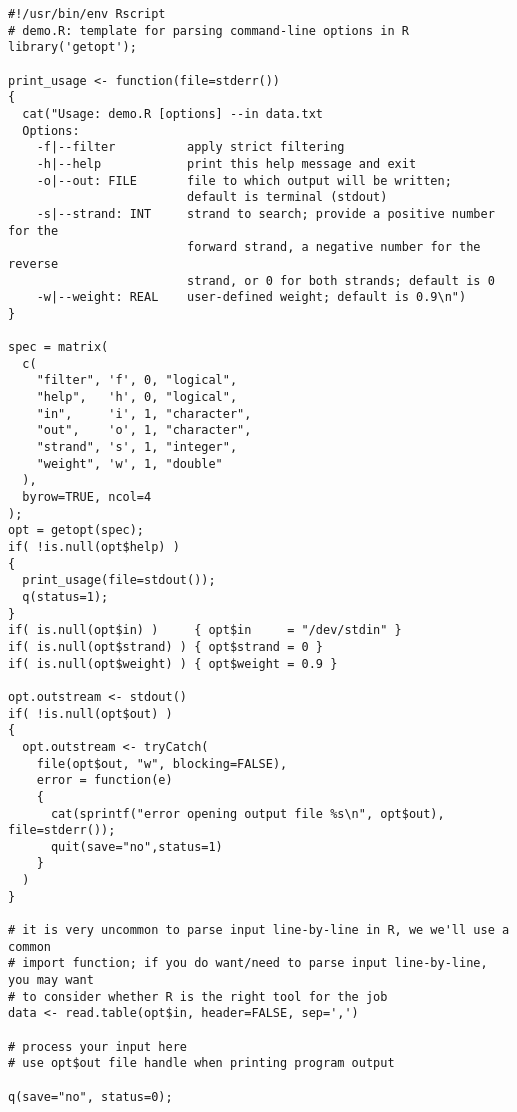 \documentclass{article}
\begin{document}
\begin{verbatim}
#!/usr/bin/env Rscript
# demo.R: template for parsing command-line options in R
library('getopt');

print_usage <- function(file=stderr())
{
  cat("Usage: demo.R [options] --in data.txt
  Options:
    -f|--filter          apply strict filtering
    -h|--help            print this help message and exit
    -o|--out: FILE       file to which output will be written;
                         default is terminal (stdout)
    -s|--strand: INT     strand to search; provide a positive number for the
                         forward strand, a negative number for the reverse
                         strand, or 0 for both strands; default is 0
    -w|--weight: REAL    user-defined weight; default is 0.9\n")
}

spec = matrix(
  c(
    "filter", 'f', 0, "logical",
    "help",   'h', 0, "logical",
    "in",     'i', 1, "character",
    "out",    'o', 1, "character",
    "strand", 's', 1, "integer",
    "weight", 'w', 1, "double"
  ),
  byrow=TRUE, ncol=4
);
opt = getopt(spec);
if( !is.null(opt$help) )
{
  print_usage(file=stdout());
  q(status=1);
}
if( is.null(opt$in) )     { opt$in     = "/dev/stdin" }
if( is.null(opt$strand) ) { opt$strand = 0 }
if( is.null(opt$weight) ) { opt$weight = 0.9 }

opt.outstream <- stdout()
if( !is.null(opt$out) )
{
  opt.outstream <- tryCatch(
    file(opt$out, "w", blocking=FALSE),
    error = function(e)
    {
      cat(sprintf("error opening output file %s\n", opt$out), file=stderr());
      quit(save="no",status=1)
    }
  )
}

# it is very uncommon to parse input line-by-line in R, we we'll use a common
# import function; if you do want/need to parse input line-by-line, you may want
# to consider whether R is the right tool for the job
data <- read.table(opt$in, header=FALSE, sep=',')

# process your input here
# use opt$out file handle when printing program output

q(save="no", status=0);
\end{verbatim}
\end{document}
